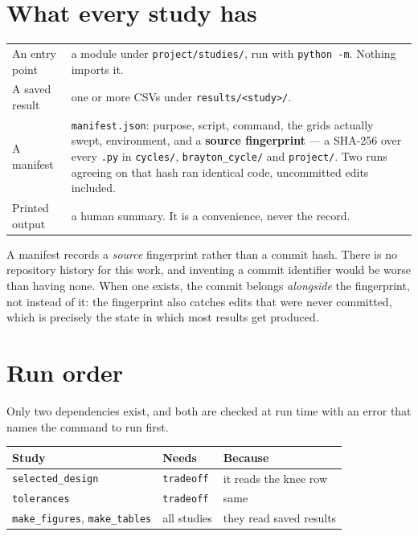 \documentclass[11pt,a4paper]{report}
\newcommand{\code}[1]{\texttt{\small #1}}
\begin{document}
\section{What every study has}

\begin{center}
\small
\begin{tabular}{@{}p{3.2cm}p{10.4cm}@{}}
\toprule
An entry point & a module under \code{project/studies/}, run with
\code{python -m}. Nothing imports it. \\
A saved result & one or more CSVs under \code{results/<study>/}. \\
A manifest & \code{manifest.json}: purpose, script, command, the grids
actually swept, environment, and a \textbf{source fingerprint} --- a
SHA-256 over every \code{.py} in \code{cycles/}, \code{brayton\_cycle/}
and \code{project/}. Two runs agreeing on that hash ran identical code,
uncommitted edits included. \\
Printed output & a human summary. It is a convenience, never the
record. \\
\bottomrule
\end{tabular}
\end{center}

\begin{caveat}
A manifest records a \emph{source} fingerprint rather than a commit
hash. There is no repository history for this work, and inventing a
commit identifier would be worse than having none. When one exists, the
commit belongs \emph{alongside} the fingerprint, not instead of it: the
fingerprint also catches edits that were never committed, which is
precisely the state in which most results get produced.
\end{caveat}

\section{Run order}

Only two dependencies exist, and both are checked at run time with an
error that names the command to run first.

\begin{center}
\begin{tabular}{@{}lll@{}}
\toprule
Study & Needs & Because \\
\midrule
\code{selected\_design} & \code{tradeoff} & it reads the knee row \\
\code{tolerances} & \code{tradeoff} & same \\
\code{make\_figures}, \code{make\_tables} & all studies & they read
saved results \\
\bottomrule
\end{tabular}
\end{center}
\end{document}
